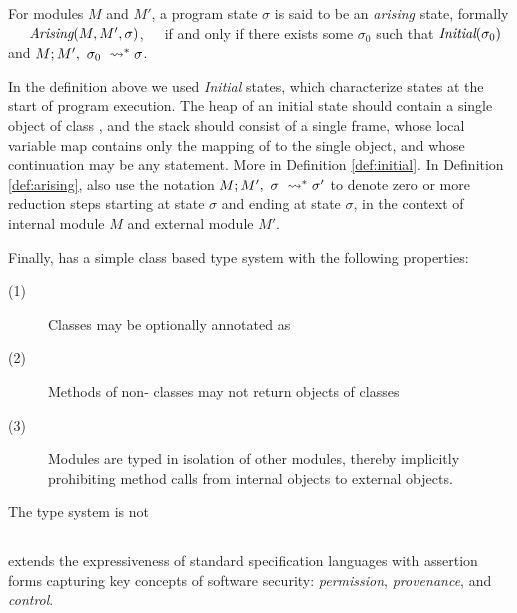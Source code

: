 \begin{definition}
\label{def:arising}
For   modules $M$ and  $M'$, a program state $\sigma$ is 
said to be an \emph{arising} state, formally \ \ \ $\textit{Arising}(M, M', \sigma)$,\ \ \ 
if and only if there exists some $\sigma_0$ such that $\textit{Initial}(\sigma_0)$ and
$M ; M',\ \sigma_0\ \leadsto^* \sigma$.
\end{definition}

In the definition above we used \emph{Initial} states, 
which  characterize states at the start of program execution.
The heap of an initial state should  contain a single object of class , and
the  stack should consist of a single frame, whose local variable map contains only the 
mapping of \prg{this} to the single object, and whose continuation may be any statement.
More in Definition \ref{def:initial}. 
In Definition \ref{def:arising},  also use the notation $M ; M',\ \sigma\ \leadsto^* \sigma'$ to denote
zero or more reduction steps starting at state $\sigma$ and ending at state $\sigma$, in the context of internal module 
$M$ and external module $M'$.

Finally, \Loo has a simple class based type system with the following properties:
\begin{description}
\item[(1)]
Classes may be optionally annotated as 
\item[(2)]
Methods of non- classes may not return objects of  classes
\item[(3)]
Modules are typed in isolation of other modules, thereby implicitly prohibiting
method calls from internal objects to external objects.
\end{description}
The type system is not 


\subsection{\SpecO}
\label{sub:SpecO}
\SpecO extends the expressiveness of standard specification languages
with assertion forms capturing key concepts of software security:
 \emph{permission}, \emph{provenance}, and \emph{control}.

